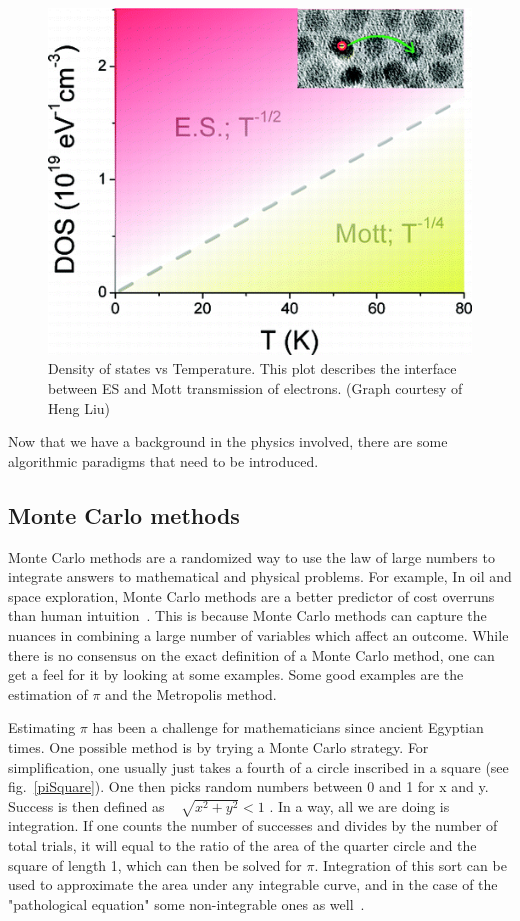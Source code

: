 \begin{figure}[htbp]
\begin{center}
\includegraphics[scale=.50]{MottvsES.png}
\caption{Density of states vs Temperature. This plot describes the interface between ES and Mott transmission of electrons. (Graph courtesy of Heng Liu)}
\label{MvsES}
\end{center}
\end{figure}

Now that we have a background in the physics involved, there are some algorithmic paradigms that need to be introduced.

\subsection{Monte Carlo methods}
Monte Carlo methods are a randomized way to use the law of large numbers to integrate answers to mathematical and physical problems. For example, In oil and space exploration, Monte Carlo methods are a better predictor of cost overruns than human intuition~\cite{Hubbard09}. This is because Monte Carlo methods can capture the nuances in combining a large number of variables which affect an outcome. While there is no consensus on the exact definition of a Monte Carlo method, one can get a feel for it by looking at some examples. Some good examples are the estimation of $\pi$ and the Metropolis method.

Estimating $\pi$ has been a challenge for mathematicians since ancient Egyptian times. One possible method is by trying a Monte Carlo strategy. For simplification, one usually just takes a fourth of a circle inscribed in a square (see fig.~\ref{piSquare}). One then picks random numbers between 0 and 1 for x and y. Success is then defined as ~\cite{Kalos08} $\sqrt{x^2 + y^2} < 1$ .
In a way, all we are doing is integration. If one counts the number of successes and divides by the number of total trials, it will equal to the ratio of the area of the quarter circle and the square of length 1, which can then be solved for $\pi$. Integration of this sort can be used to approximate the area under any integrable curve, and in the case of the "pathological equation" some non-integrable ones as well~\cite{Newman99}. 

